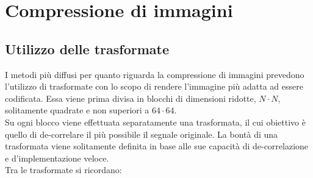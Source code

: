 \section{Compressione di immagini}



\subsection{Utilizzo delle trasformate}

I metodi più diffusi per quanto riguarda la compressione di immagini prevedono 
l'utilizzo di trasformate con lo scopo di rendere l'immagine più adatta ad 
essere codificata.
Essa viene prima divisa in blocchi di dimensioni ridotte, $N \cdot N$, 
solitamente quadrate e non superiori a $64 \cdot 64$.\\

Su ogni blocco viene effettuata separatamente una trasformata, il cui obiettivo 
è quello di de-correlare il più possibile il segnale originale. La bontà di una 
trasformata viene solitamente definita in base alle sue capacità di 
de-correlazione e d'implementazione veloce.\\

Tra le trasformate si ricordano:

